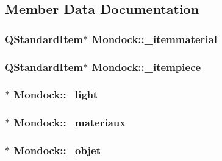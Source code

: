 \subsection{Member Data Documentation}
\hypertarget{class_mondock_ab873f19cf3a771dcb0f32480e3ea2c69}{
\subsubsection[{\+\_\+itemmaterial}]{\setlength{\rightskip}{0pt plus 5cm}Q\+Standard\+Item$\ast$ Mondock\+::\+\_\+itemmaterial}}\label{class_mondock_ab873f19cf3a771dcb0f32480e3ea2c69}
\hypertarget{class_mondock_a3de76b6bfaee199ee945f04c3c2f4c02}{
\subsubsection[{\+\_\+itempiece}]{\setlength{\rightskip}{0pt plus 5cm}Q\+Standard\+Item$\ast$ Mondock\+::\+\_\+itempiece}}\label{class_mondock_a3de76b6bfaee199ee945f04c3c2f4c02}
\hypertarget{class_mondock_a541a241aadaf9820926b427f2d504573}{
\subsubsection[{\+\_\+light}]{$\ast$ Mondock\+::\+\_\+light}}\label{class_mondock_a541a241aadaf9820926b427f2d504573}
\hypertarget{class_mondock_ada15f5ec6dabb8728651472f5cc867a8}{
\subsubsection[{\+\_\+materiaux}]{$\ast$ Mondock\+::\+\_\+materiaux}}\label{class_mondock_ada15f5ec6dabb8728651472f5cc867a8}
\hypertarget{class_mondock_a6325a3fb92643c99815b1a8025f7d401}{
\subsubsection[{\+\_\+objet}]{$\ast$ Mondock\+::\+\_\+objet}}\label{class_mondock_a6325a3fb92643c99815b1a8025f7d401}

